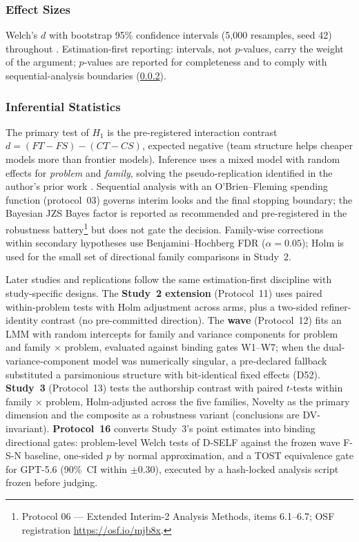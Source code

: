 \documentclass[12pt,a4paper]{article}
\begin{document}
\subsubsection{Effect Sizes}

Welch's $d$ with bootstrap 95\% confidence intervals (5{,}000 resamples, seed
42) throughout \citep{Lakens2013}. Estimation-first reporting: intervals, not
$p$-values, carry the weight of the argument; $p$-values are reported for
completeness and to comply with sequential-analysis boundaries
(\cref{sec:inferential}).

\subsubsection{Inferential Statistics}\label{sec:inferential}

The primary test of $H_1$ is the pre-registered interaction contrast
$d = (FT - FS) - (CT - CS)$, expected negative (team structure helps cheaper
models more than frontier models). Inference uses a mixed model with random
effects for \emph{problem} and \emph{family}, solving the pseudo-replication
identified in the author's
prior work \citep{Hariri2026b}. Sequential analysis with an O'Brien--Fleming
spending function (protocol~03) governs interim looks and the final stopping
boundary; the Bayesian JZS Bayes factor is reported as recommended and
pre-registered in the robustness battery\footnote{Protocol 06 --- Extended
Interim-2 Analysis Methods, items 6.1--6.7; OSF registration
\url{https://osf.io/mjb8x}.} but
does not gate the decision. Family-wise corrections within secondary hypotheses
use Benjamini--Hochberg FDR ($\alpha = 0.05$); Holm is used for the small set of
directional family comparisons in Study~2.

Later studies and replications follow the same estimation-first discipline with
study-specific designs. The \textbf{Study~2 extension} (Protocol~11) uses paired
within-problem tests with Holm adjustment across arms, plus a two-sided
refiner-identity contrast (no pre-committed direction). The \textbf{wave}
(Protocol~12) fits an LMM with random intercepts for family and variance
components for problem and family $\times$ problem, evaluated against binding
gates W1--W7; when the dual-variance-component model was numerically singular, a
pre-declared fallback substituted a parsimonious structure with bit-identical
fixed effects (D52). \textbf{Study~3} (Protocol~13) tests the authorship
contrast with paired $t$-tests within family $\times$ problem, Holm-adjusted
across the five families, Novelty as the primary dimension and the composite as
a robustness variant (conclusions are DV-invariant). \textbf{Protocol~16}
converts Study~3's point estimates into binding directional gates: problem-level
Welch tests of D-SELF against the frozen wave F-S-N baseline, one-sided $p$ by
normal approximation, and a TOST equivalence gate for GPT-5.6 (90\%~CI within
$\pm 0.30$), executed by a hash-locked analysis script frozen before judging.
\end{document}
